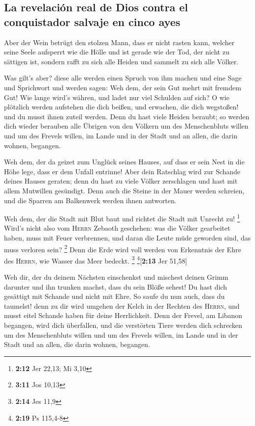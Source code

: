 \hypertarget{la-revelaciuxf3n-real-de-dios-contra-el-conquistador-salvaje-en-cinco-ayes}{%
\subsection{La revelación real de Dios contra el conquistador salvaje en
cinco
ayes}\label{la-revelaciuxf3n-real-de-dios-contra-el-conquistador-salvaje-en-cinco-ayes}}

 Aber der Wein betrügt den stolzen Mann, dass er nicht
rasten kann, welcher seine Seele aufsperrt wie die Hölle und ist gerade
wie der Tod, der nicht zu sättigen ist, sondern rafft zu sich alle
Heiden und sammelt zu sich alle Völker.

 Was gilt's aber? diese alle werden einen Spruch von ihm
machen und eine Sage und Sprichwort und werden sagen: Weh dem, der sein
Gut mehrt mit fremdem Gut! Wie lange wird's währen, und ladet nur viel
Schulden auf sich?  O wie plötzlich werden aufstehen die
dich beißen, und erwachen, die dich wegstoßen! und du musst ihnen zuteil
werden.  Denn du hast viele Heiden beraubt; so werden dich
wieder berauben alle Übrigen von den Völkern um des Menschenbluts willen
und um des Frevels willen, im Lande und in der Stadt und an allen, die
darin wohnen, begangen.

 Weh dem, der da geizet zum Unglück seines Hauses, auf
dass er sein Nest in die Höhe lege, dass er dem Unfall entrinne!
 Aber dein Ratschlag wird zur Schande deines Hauses
geraten; denn du hast zu viele Völker zerschlagen und hast mit allem
Mutwillen gesündigt.  Denn auch die Steine in der Mauer
werden schreien, und die Sparren am Balkenwerk werden ihnen antworten.

 Weh dem, der die Stadt mit Blut baut und richtet die
Stadt mit Unrecht zu! \footnote{\textbf{2:12} Jer 22,13; Mi 3,10}
 Wird's nicht also vom \textsc{Herrn} Zebaoth geschehen:
was die Völker gearbeitet haben, muss mit Feuer verbrennen, und daran
die Leute müde geworden sind, das muss verloren sein? \footnote{\textbf{3:11}
  Jos 10,13}  Denn die Erde wird voll werden von
Erkenntnis der Ehre des \textsc{Herrn}, wie Wasser das Meer bedeckt.
\footnote{\textbf{2:14} Jes 11,9} \footnote{\textbf{2:19} Ps 115,4-8}{[}\textbf{2:13}
Jer 51,58{]}

 Weh dir, der du deinem Nächsten einschenkst und mischest
deinen Grimm darunter und ihn trunken machst, dass du sein Blöße sehest!
 Du hast dich gesättigt mit Schande und nicht mit Ehre.
So saufe du nun auch, dass du taumelst! denn zu dir wird umgehen der
Kelch in der Rechten des \textsc{Herrn}, und musst eitel Schande haben
für deine Herrlichkeit.  Denn der Frevel, am Libanon
begangen, wird dich überfallen, und die verstörten Tiere werden dich
schrecken um des Menschenbluts willen und um des Frevels willen, im
Lande und in der Stadt und an allen, die darin wohnen, begangen.

